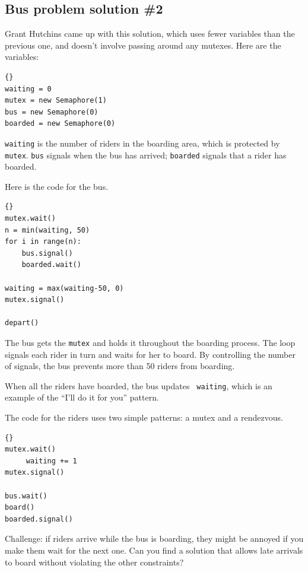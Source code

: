 \documentclass{book}
\begin{document}
\subsection {Bus problem solution \#2}

Grant Hutchins came up with this solution, which uses fewer
variables than the previous one, and doesn't involve passing
around any mutexes.  Here are the variables:

\begin{lstlisting}[title={Bus problem solution \#2 (initialization)}]{}
waiting = 0
mutex = new Semaphore(1)
bus = new Semaphore(0)
boarded = new Semaphore(0)
\end{lstlisting}

{\tt waiting} is the number of riders in the boarding area,
which is protected by {\tt mutex}.  {\tt bus} signals when the
bus has arrived; {\tt boarded} signals that a rider has boarded.

Here is the code for the bus.

\newpage
\begin{lstlisting}[title={Bus problem solution (bus)}]{}
mutex.wait()
n = min(waiting, 50)
for i in range(n):
    bus.signal()
    boarded.wait()

waiting = max(waiting-50, 0)
mutex.signal()

depart()
\end{lstlisting}

The bus gets the {\tt mutex} and holds it throughout the boarding
process.  The loop signals each rider in turn and waits for her to
board.  By controlling the number of signals, the bus prevents
more than 50 riders from boarding.

When all the riders have boarded, the bus updates {\tt
        waiting}, which is an example of the ``I'll do it for you'' pattern.

The code for the riders uses two
simple patterns: a mutex and a rendezvous.

\newpage
\begin{lstlisting}[title={Bus problem solution (riders)}]{}
mutex.wait()
     waiting += 1
mutex.signal()

bus.wait()
board()
boarded.signal()
\end{lstlisting}

Challenge: if riders arrive while the bus is boarding, they
might be annoyed if you make them wait for the next one.  Can you
find a solution that allows late arrivals to board without violating
the other constraints?
\end{document}
